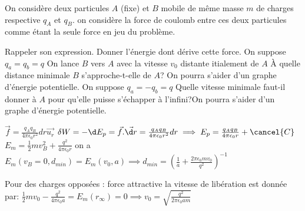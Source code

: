 \begin{Exercise}[title=Interaction de particules chargée]
  On considère deux particules $A$ (fixe) et $B$ mobile de même masse $m$ de
  charges respective $q_A$ et $q_B$. on considère la force de coulomb entre ces
  deux particules comme étant la seule force en jeu du problème.

  \Question Rappeler son expression.
  \Question Donner l'énergie dont dérive cette force.
  \Question On suppose $q_a=q_b=q$ On lance $B$ vers $A$ avec la vitesse $v_0$
  distante itialement de $A$ À quelle distance minimale $B$ s'approche-t-elle de
  $A$? On pourra s'aider d'un graphe d'énergie potentielle.
  \Question On suppose $q_a=-q_b=q$ Quelle vitesse minimale faut-il donner à $A$
  pour qu'elle puisse s'échapper à l'infini?On pourra s'aider d'un graphe
  d'énergie potentielle.

\end{Exercise}
\begin{Answer}
	\Question $\vec{f}=\frac{q_Aq_B}{4\pi\epsilon_0r^2}dr\vec{u_r}$
	\Question $\delta W =-\d E_p = \vec{f}.\vec{\d r} = \frac{q_Aq_B}{4\pi\epsilon_0r^2}dr
	 \implies E_p = \frac{q_Aq_B}{4\pi\epsilon_0r}+\cancel{C}$
	\Question $E_m = \frac{1}{2}mv_B^2 + \frac{q^2}{4\pi\epsilon_0 r}$
	on a $E_m(v_B=0,d_{min}) = E_m(v_0,a) \implies d_{min}
    =\left(\frac{1}{a}+\frac{2\pi\epsilon_0 m v_0}{q^2}\right)^{-1}$

	\Question Pour des charges opposées : force attractive la vitesse de
    libération est donnée par:
    $ \frac{1}{2}mv_0 -\frac{q^2}{4\pi\epsilon_0 a} = E_m(r_\infty) =0 \implies v_0 =
    \sqrt{\frac{q^2}{2\pi\epsilon_0 a m}}$
\end{Answer}
